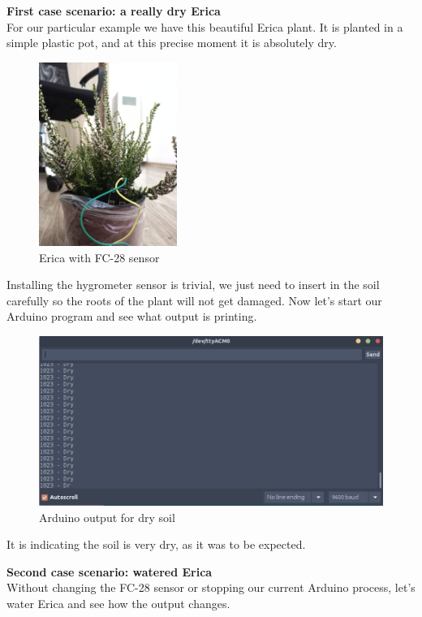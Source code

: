 \textbf{First case scenario: a really dry Erica} \\
For our particular example we have this beautiful Erica plant. It is planted in a simple plastic pot, and at this precise moment it is absolutely dry.

\begin{figure}[H]
    \centering
    \includegraphics[width=0.4\textwidth]{fig/erica.jpg}
    \caption{Erica with FC-28 sensor}
    \label{fig:erica}
\end{figure}


Installing the hygrometer sensor is trivial, we just need to insert in the soil carefully so the roots of the plant will not get damaged. Now let's start our Arduino program and see what output is printing.

\begin{figure}[H]
    \centering
    \includegraphics[width=1\textwidth]{fig/seco.png}
    \caption{Arduino output for dry soil}
    \label{fig:dry-soil}
\end{figure}

It is indicating the soil is very dry, as it was to be expected.

\textbf{Second case scenario: watered Erica} \\
Without changing the FC-28 sensor or stopping our current Arduino process, let's water Erica and see how the output changes.


